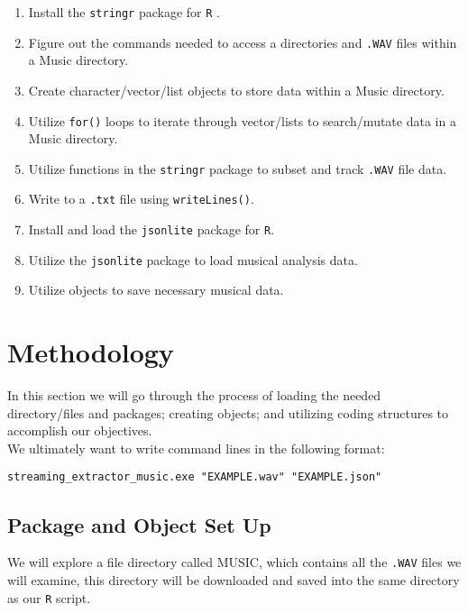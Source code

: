 \documentclass{article}\usepackage[]{graphicx}\usepackage[]{xcolor}
\begin{document}
\begin{multicols}{2}
\begin{enumerate}
  \item Install the \texttt{stringr} package for \texttt{R} \citep{stringr}. 
  \item Figure out the commands needed to access a directories and \texttt{.WAV} files 
  within a Music directory. 
  \item Create character/vector/list objects to store data within a Music
  directory.
  \item Utilize \texttt{for()} loops to iterate through vector/lists
  to search/mutate data in a Music directory. 
  \item Utilize functions in the \texttt{stringr} package to subset
  and track \texttt{.WAV} file data. 
  \item Write to a \texttt{.txt} file using \texttt{writeLines()}. 
  \item Install and load the \texttt{jsonlite} package for \texttt{R}.
  \item Utilize the \texttt{jsonlite} package to load musical analysis
  data. \citep{jsonlite}
  \item Utilize objects to save necessary musical data.
\end{enumerate}

\columnbreak

\section{Methodology}
In this section we will go through the process of loading the needed directory/files and 
packages; creating objects; and utilizing coding structures to accomplish our objectives. \\

We ultimately want to write command lines in the following format: 
\begin{center}
\begin{footnotesize}
  \texttt{streaming}\verb|_|\texttt{extractor}\verb|_|\texttt{music.exe "EXAMPLE.wav" "EXAMPLE.json"}
\end{footnotesize}
\end{center}

\subsection{Package and Object Set Up}
We will explore a file directory called MUSIC, which contains all the \texttt{.WAV} files we will
examine, this directory will be downloaded and saved into the same directory as our \texttt{R} script.


\end{multicols}
\end{document}
